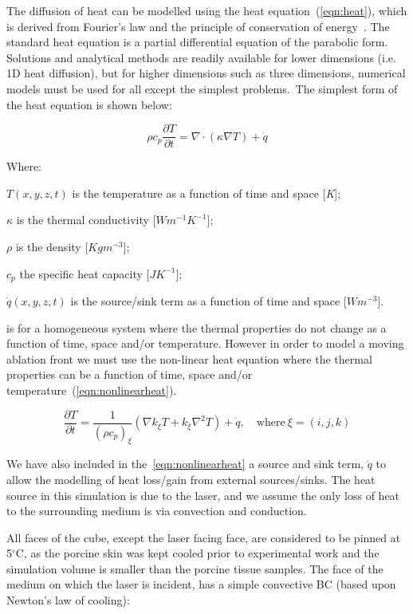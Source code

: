 The diffusion of heat can be modelled using the heat equation~(\cref{eqn:heat}), which is derived from Fourier's law and the principle of conservation of energy~\cite{widder1976heat}.%
The standard heat equation is a partial differential equation of the parabolic form. Solutions and analytical methods are readily available for lower dimensions (i.e. 1D heat diffusion), but for higher dimensions such as three dimensions, numerical models must be used for all except the simplest problems.~The simplest form of the heat equation is shown below:

\begin{equation}
\rho c_p \frac{\partial T}{\partial t}= \nabla \cdot (\kappa \nabla T) + \dot{q}
\label{eqn:heat}
\end{equation}

\noindent Where:

	\indent $T(x, y, z, t)$ is the temperature as a function of time and space [\textit{K}];
	
	\indent $\kappa$ is the thermal conductivity [$W m^{-1} K^{-1}$];
	
	\indent $\rho$ is the density [$Kg  m^{-3}$];
	
	\indent $c_p$ the specific heat capacity [$J K^{-1}$];
	
	\indent $\dot{q}(x,y,z,t)$ is the source/sink term as a function of time and space [$W m^{-3}$].
	
	\medskip

 is for a homogeneous system where the thermal properties do not change as a function of time, space and/or temperature. However in order to model a moving ablation front we must use the non-linear heat equation where the thermal properties can be a function of time, space and/or temperature~(\cref{eqn:nonlinearheat}).

\begin{equation}
\frac{\partial T}{\partial t} = \frac{1}{(\rho c_p)_{\xi}}(\nabla k_\xi T + k_\xi\nabla^2T)+\dot{q},\quad \text{where}\ \xi=(i,j,k)
\label{eqn:nonlinearheat}
\end{equation}

We have also included in the~\cref{eqn:nonlinearheat} a source and sink term, $\dot{q}$ to allow the modelling of heat loss/gain from external sources/sinks. The heat source in this simulation is due to the laser, and we assume the only loss of heat to the surrounding medium is via convection and conduction.
	
All faces of the cube, except the laser facing face, are considered to be pinned at 5$^{\circ}$C, as the porcine skin was kept cooled prior to experimental work and the simulation volume is smaller than the porcine tissue samples. The face of the medium on which the laser is incident, has a simple convective BC (based upon Newton’s law of cooling):	

